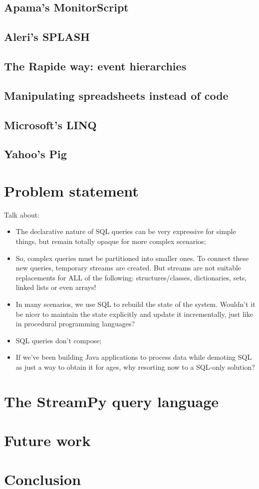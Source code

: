 \documentclass[twoside]{report}
\begin{document}
\section{Apama's MonitorScript}

\section{Aleri's SPLASH}

\section{The Rapide way: event hierarchies}

\section{Manipulating spreadsheets instead of code}

\section{Microsoft's LINQ}

\section{Yahoo's Pig}

\chapter{Problem statement}\label{problem-statement}

Talk about:
\begin{itemize}
\item The declarative nature of SQL queries can be very expressive for simple things, but remain totally opaque for more complex scenarios;
\item So, complex queries must be partitioned into smaller ones. To connect these new queries, temporary streams are created. But streams are not suitable replacements for ALL of the following: structures/classes, dictionaries, sets, linked lists or even arrays!
\item In many scenarios, we use SQL to rebuild the state of the system. Wouldn't it be nicer to maintain the state explicitly and update it incrementally, just like in procedural programming languages?
\item SQL queries don't compose;
\item If we've been building Java applications to process data while demoting SQL as just a way to obtain it for ages, why resorting now to a SQL-only solution?
\end{itemize}

\chapter{The StreamPy query language}\label{streampy}

\chapter{Future work}\label{future-work}

\chapter{Conclusion}\label{conclusion}
\end{document}
